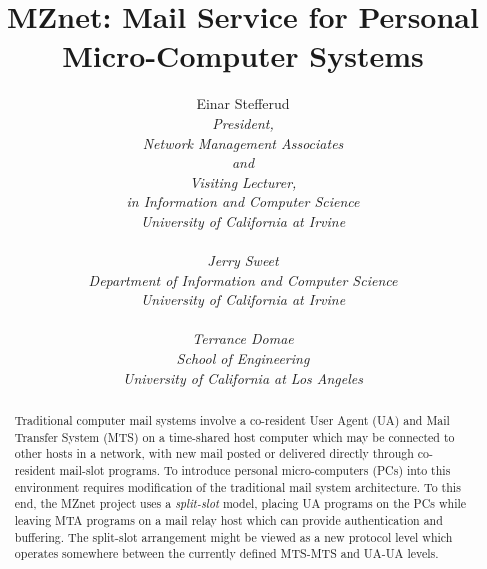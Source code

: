 
\setcounter{page}{0}
\pagestyle{empty}


\def\tagfigure#1#2#3{%
    \begin{figure}[t]
	\hrule
	\vskip.5\baselineskip
	\begin{small}\rm
	    #1\relax
	    \centerline{\box\graph}
	\end{small}
	\vskip.5\baselineskip plus.5\baselineskip
	\caption{#2}
	\label{#3}
	\vskip2pt
	\hrule
    \end{figure}
}



\title{MZnet:  Mail Service for Personal Micro-Computer Systems}
\author{Einar Stefferud\\
	\it President,\\
	\it Network Management Associates\\
	and\\
	\it Visiting Lecturer,\\
	\it in Information and Computer Science\\
	\it University of California at Irvine\\ \quad\\
Jerry Sweet\\
	\it Department of Information and Computer Science\\
	\it University of California at Irvine\\ \quad\\
Terrance Domae\\
	\it School of Engineering\\
	\it University of California at Los Angeles}
\date{}
\maketitle

\newpage

\begin{abstract}
Traditional computer mail systems involve a co-resident User Agent (UA)
and Mail Transfer System (MTS) on a time-shared host computer 
which may be connected to other hosts in a network,
with new mail posted or delivered directly through 
co-resident mail-slot programs.
To introduce personal micro-computers (PCs) into this environment 
requires modification of the traditional mail system architecture.
To this end, the MZnet project uses a {\it split-slot} model,
placing UA programs on the PCs while leaving MTA programs
on a mail relay host which can provide authentication and buffering.
The split-slot arrangement might be viewed as a new protocol level which 
operates somewhere between the currently defined MTS-MTS and UA-UA levels. 
\end{abstract}

